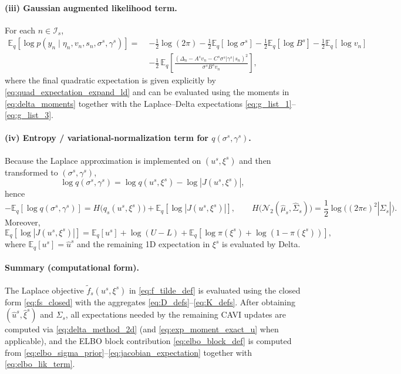 \documentclass[11pt]{article}
\newcommand{\1}{\mathbb{I}}
\newcommand{\N}{\mathcal{N}}
\newcommand{\E}{\mathbb{E}}
\begin{document}
\paragraph{(iii) Gaussian augmented likelihood term.}
For each $n\in\mathcal{I}_s$,
\begin{align}
\E_q[\log p(y_n\mid \eta_n,v_n,s_n,\sigma^s,\gamma^s)]
=\;&
-\frac12\log(2\pi)
-\frac12\E_q[\log\sigma^s]
-\frac12\E_q[\log B^s]
-\frac12\E_q[\log v_n]\nonumber\\
&-\frac12\,\E_q\!\left[\frac{(\Delta_n-A^s v_n-C^s\sigma^s|\gamma^s|\,s_n)^2}{\sigma^s B^s v_n}\right],
\label{eq:elbo_lik_term}
\end{align}
where the final quadratic expectation is given explicitly by \eqref{eq:quad_expectation_expand_ld} and can be
evaluated using the moments in \eqref{eq:delta_moments} together with the Laplace--Delta expectations
\eqref{eq:g_list_1}--\eqref{eq:g_list_3}.

\paragraph{(iv) Entropy / variational-normalization term for $q(\sigma^s,\gamma^s)$.}
Because the Laplace approximation is implemented on $(u^s,\xi^s)$ and then transformed to $(\sigma^s,\gamma^s)$,
\begin{equation}
\log q(\sigma^s,\gamma^s)=\log q(u^s,\xi^s)-\log|J(u^s,\xi^s)|,
\label{eq:q_change_of_vars}
\end{equation}
hence
\begin{equation}
-\E_q[\log q(\sigma^s,\gamma^s)]
=
H\!\big(q_s(u^s,\xi^s)\big) + \E_q[\log|J(u^s,\xi^s)|],
\qquad
H\!\big(\N_2(\hat\mu_s,\hat\Sigma_s)\big)=\frac12\log\!\big((2\pi e)^2|\hat\Sigma_s|\big).
\label{eq:entropy_term_u_xi}
\end{equation}
Moreover,
\begin{equation}
\E_q[\log|J(u^s,\xi^s)|]
=
\E_q[u^s]+\log(U-L)+\E_q[\log\pi(\xi^s)+\log(1-\pi(\xi^s))],
\label{eq:jacobian_expectation}
\end{equation}
where $\E_q[u^s]=\hat u^s$ and the remaining 1D expectation in $\xi^s$ is evaluated by Delta.

\paragraph{Summary (computational form).}
The Laplace objective $\tilde f_s(u^s,\xi^s)$ in \eqref{eq:f_tilde_def} is evaluated using the closed form
\eqref{eq:fs_closed} with the aggregates \eqref{eq:D_defs}--\eqref{eq:K_defs}.
After obtaining $(\hat u^s,\hat\xi^s)$ and $\hat\Sigma_s$, all expectations needed by the remaining CAVI updates
are computed via \eqref{eq:delta_method_2d} (and \eqref{eq:exp_moment_exact_u} when applicable), and the ELBO
block contribution \eqref{eq:elbo_block_def} is computed from
\eqref{eq:elbo_sigma_prior}--\eqref{eq:jacobian_expectation} together with \eqref{eq:elbo_lik_term}.
\end{document}
